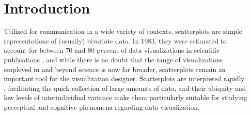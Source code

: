\documentclass[manuscript,screen,review,anonymous]{acmart}
\begin{document}



\maketitle

\setlength{\parskip}{-0.1pt}

\section{Introduction}\label{sec-intro}

Utilized for communication in a wide variety of contexts, scatterplots
are simple representations of (usually) bivariate data. In 1983, they
were estimated to account for between 70 and 80 percent of data
visualizations in scientific publications \citep{tufte_1983}, and while
there is no doubt that the range of visualizations employed in and
beyond science is now far broader, scatterplots remain an important tool
for the visualization designer. Scatterplots are interpreted rapidly
\citep{rensink_2014}, facilitating the quick collection of large amounts
of data, and their ubiquity \citep{tufte_1983} and low levels of
interindividual variance \citep{kay_2015} make them particularly
suitable for studying perceptual and cognitive phenomena regarding data
visualization.
\end{document}
